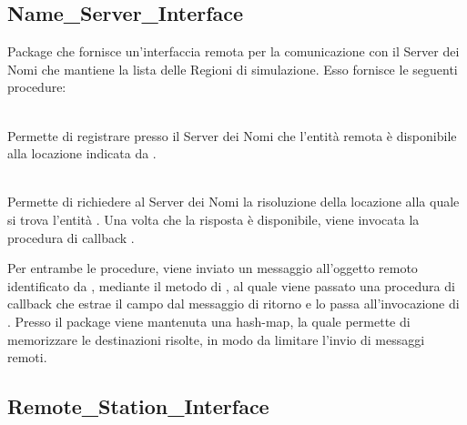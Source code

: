 	\subsection{Name\_Server\_Interface}
	
	Package che fornisce un'interfaccia remota per la comunicazione con il Server dei Nomi che mantiene la lista delle Regioni di simulazione. Esso fornisce le seguenti procedure:
	\begin{description}
		\item {} \\
		
	Permette di registrare presso il Server dei Nomi che l'entità remota  è disponibile alla locazione indicata da . 
	
	\item {} \\
		
		Permette di richiedere al Server dei Nomi la risoluzione della locazione alla quale si trova l'entità . Una volta che la risposta è disponibile, viene invocata la procedura di callback . 
				
	\end{description}
	
	Per entrambe le procedure, viene inviato un messaggio all'oggetto remoto identificato da , mediante il metodo  di , al quale viene passato una procedura di callback che estrae il campo  dal messaggio di ritorno e lo passa all'invocazione di . Presso il package viene mantenuta una hash-map, la quale permette di memorizzare le destinazioni risolte, in modo da limitare l'invio di messaggi remoti.
	
	\subsection{Remote\_Station\_Interface}
	

